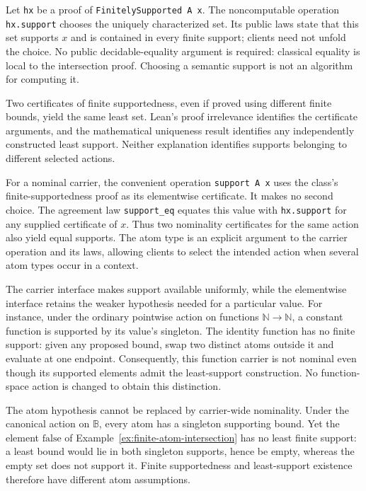 Let \texttt{hx} be a proof of \texttt{FinitelySupported A x}.
The noncomputable operation \texttt{hx.support} chooses the uniquely
characterized set. Its public laws
state that this set supports $x$ and is contained in every finite support;
clients need not unfold the choice. No public decidable-equality argument is
required: classical equality is local to the intersection proof. Choosing a
semantic support is not an algorithm for computing it.

Two certificates of finite supportedness, even if proved using different
finite bounds, yield the same least set. Lean's proof irrelevance identifies
the certificate arguments, and the mathematical uniqueness result identifies
any independently constructed least support. Neither explanation identifies
supports belonging to different selected actions.

For a nominal carrier, the convenient operation \texttt{support A x} uses
the class's finite-supportedness proof as its elementwise certificate.
It makes no second choice. The agreement law \texttt{support\_eq} equates
this value with \texttt{hx.support} for any supplied certificate of $x$.
Thus two nominality certificates for the same action also yield equal
supports. The atom type is an explicit argument to the carrier operation
and its laws, allowing clients to select the intended action when several
atom types occur in a context.

The carrier interface makes support available uniformly, while the
elementwise interface retains the weaker hypothesis needed for a particular
value. For instance, under the ordinary pointwise action on functions
$\mathbb N\to\mathbb N$, a constant function is supported by its value's
singleton. The identity function has no finite support: given any proposed
bound, swap two distinct atoms outside it and evaluate at one endpoint.
Consequently, this function carrier is not nominal even though its supported
elements admit the least-support construction. No function-space action is
changed to obtain this distinction.

The atom hypothesis cannot be replaced by carrier-wide nominality. Under the
canonical action on $\mathbb B$, every atom has a singleton supporting bound.
Yet the element $\mathrm{false}$ of
Example~\ref{ex:finite-atom-intersection} has no least finite support: a least
bound would lie in both singleton supports, hence be empty, whereas the empty
set does not support it. Finite supportedness and least-support existence
therefore have different atom assumptions.

